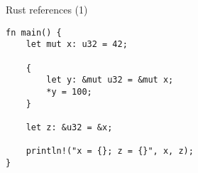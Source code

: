 \begin{frame}[fragile,label=rustTimesTwoB]{Rust references (1)}
\vspace{-.25cm}
    \begin{verbatim}
fn main() {
    let mut x: u32 = 42;

    {
        let y: &mut u32 = &mut x;
        *y = 100;
    }

    let z: &u32 = &x;

    println!("x = {}; z = {}", x, z);
}
\end{verbatim}
\end{frame}

